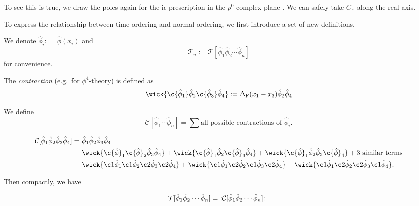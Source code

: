 \documentclass[a4paper,11pt]{article}
\begin{document}
	To see this is true, we draw the poles again for the $\mathrm{i}\epsilon$-prescription in the $p^0$-complex plane
	. We can safely take $C_\text{F}$ along the real axis.

	To express the relationship between time ordering and normal ordering, we first introduce a set of new definitions.

	We denote $\hat \phi_i : = \hat \phi(x_i)$ and 
	\[
		\mathcal{T}_n := \mathcal{T}[\hat \phi_1 \hat \phi_2 \cdots \hat \phi_n]
	\]
	for convenience.

	\begin{defi}
		The \emph{contraction} (e.g.\ for $\phi^4$-theory) is defined as 
		\[
			\wick{\c {\hat \phi_1} \hat \phi_2 \c {\hat \phi_3} \hat \phi_4} : = \Delta _{\text{F}}(x_1 - x_3) \hat \phi_2 \hat \phi_4
		\]
	\end{defi}

	\begin{defi}
		We define
		\[
			\mathcal{C}[\hat \phi_1 \cdots \hat \phi_n] = \sum \text{all possible contractions of }\hat \phi_i .
		\]
	\end{defi}

	\begin{ex}
		\begin{align*}
			\mathcal{C}[\hat \phi_1 \hat \phi_2 \hat \phi_3 \hat \phi_4] =\ & \hat \phi_1 \hat \phi_2 \hat \phi_3 \hat \phi_4 \\
			+ &\wick{\c {\hat{\phi}}_1 \c {\hat{\phi}}_2 \hat \phi_3 \hat \phi_4} + \wick{\c {\hat \phi}_1 \hat \phi_2 \c{\hat \phi}_3 \hat \phi_4} + \wick{\c{\hat \phi}_1 \hat \phi_2 \hat \phi_3 \c{\hat \phi}_4} +  \text{3 similar terms}\\
			+ & \wick{\c1 {\hat{\phi}}_1 \c1 {\hat{\phi}}_2 \c2{\hat \phi}_3 \c2{\hat \phi}_4} + \wick{\c1 {\hat{\phi}}_1 \c2 {\hat{\phi}}_2 \c1{\hat \phi}_3 \c2{\hat \phi}_4} + \wick{\c1 {\hat{\phi}}_1 \c2 {\hat{\phi}}_2 \c2{\hat \phi}_3 \c1{\hat \phi}_4}.
		\end{align*}
	\end{ex}
	Then compactly, we have
	\begin{thm}
		\[
			\mathcal{T}[\hat \phi_1 \hat \phi_2 \cdots \hat \phi_n] =\ :\mathrel{\mathcal{C}[\hat \phi_1 \hat \phi_2 \cdots \hat \phi_n]}:.
		\]
	\end{thm}
	
\end{document}
